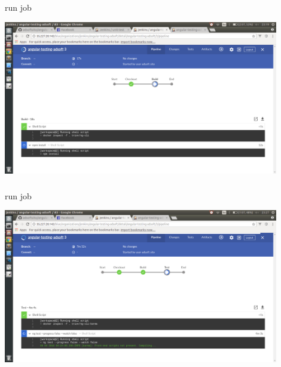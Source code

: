\documentclass{beamer}
\begin{document}
\begin{frame}\frametitle{} 

\begin{block}{run job}
\end{block}


\begin{center}
\includegraphics[width=0.9\textwidth]{jenkins-build.png}
\end{center}

\end{frame}



\begin{frame}\frametitle{} 

\begin{block}{run job}
\end{block}


\begin{center}
\includegraphics[width=0.9\textwidth]{jenkins-testing.png}
\end{center}

\end{frame}
\end{document}
